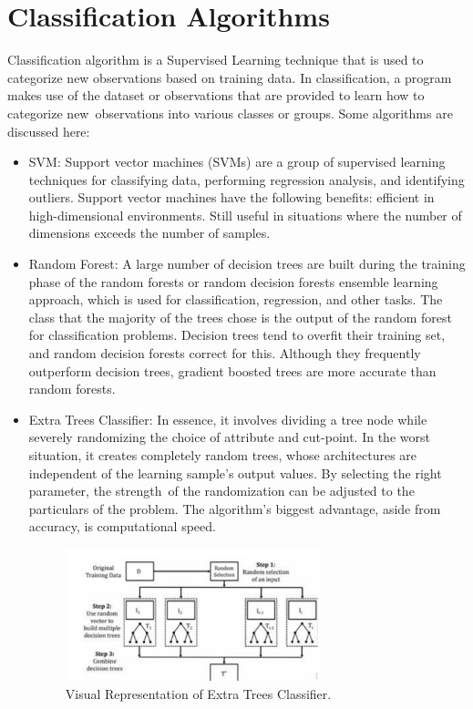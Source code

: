\section{Classification Algorithms}
Classification algorithm is a Supervised Learning technique that is used to categorize new observations based on training data. In classification, a program makes use of the dataset or observations that are provided to learn how to categorize new observations into various classes or groups. Some algorithms are discussed here:
\begin{itemize}
    \item SVM: Support vector machines (SVMs) are a group of supervised learning techniques for classifying data, performing regression analysis, and identifying outliers. Support vector machines have the following benefits: efficient in high-dimensional environments. Still useful in situations where the number of dimensions exceeds the number of samples.\cite{svm}
    \item Random Forest: A large number of decision trees are built during the training phase of the random forests or random decision forests ensemble learning approach, which is used for classification, regression, and other tasks. The class that the majority of the trees chose is the output of the random forest for classification problems. Decision trees tend to overfit their training set, and random decision forests correct for this. Although they frequently outperform decision trees, gradient boosted trees are more accurate than random forests.\cite{rforest}
    \item Extra Trees Classifier: In essence, it involves dividing a tree node while severely randomizing the choice of attribute and cut-point. In the worst situation, it creates completely random trees, whose architectures are independent of the learning sample's output values. By selecting the right parameter, the strength of the randomization can be adjusted to the particulars of the problem. The algorithm's biggest advantage, aside from accuracy, is computational speed.\cite{etclassifier}
        \begin{figure}[H]
        \centering
        \includegraphics[width=0.7\textwidth]{./figure/chap 3/4.png}
        \caption{Visual Representation of Extra Trees Classifier.}
        \label{Fig 3.6}
        \end{figure}


\end{itemize}
